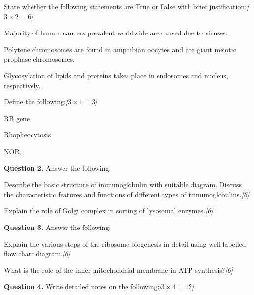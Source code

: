 \documentclass[11pt,a4paper]{article}
\newcommand{\pts}[1]{\hfill   \textit{[#1]}}
\begin{document}
\begin{parts}
  \item State whether the following statements are True or False with brief justification:\pts{$3  \times 2 = 6$}
  
\begin{parts}
    \item Majority of human cancers prevalent worldwide are caused due to viruses.
    \item Polytene chromosomes are found in amphibian oocytes and are giant meiotic prophase chromosomes.
    \item Glycosylation of lipids and proteins takes place in endosomes and nucleus, respectively.
  \end{parts}
  
  \item Define the following:\pts{$3  \times 1 = 3$}
  
\begin{parts}
    \item RB gene
    \item Rhopheocytosis
    \item NOR.
  \end{parts}
\end{parts}

\pagebreak

\medskip


\noindent   \textbf{Question 2.} Answer the following:

\begin{parts}
  \item Describe the basic structure of immunoglobulin with suitable diagram. Discuss the characteristic features and functions of different types of immunoglobulins.\pts{6}
  \item Explain the role of Golgi complex in sorting of lysosomal enzymes.\pts{6}
\end{parts}

\medskip


\noindent   \textbf{Question 3.} Answer the following:

\begin{parts}
  \item Explain the various steps of the ribosome biogenesis in detail using well-labelled flow chart diagram.\pts{6}
  \item What is the role of the inner mitochondrial membrane in ATP synthesis?\pts{6}
\end{parts}

\medskip


\noindent   \textbf{Question 4.} Write detailed notes on the following:\pts{$3  \times 4 = 12$}
\end{document}
